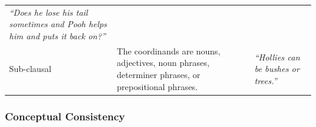 \documentclass[oneside]{report}
\theoremstyle{definition}
\theoremstyle{definition}
\theoremstyle{definition}
\theoremstyle{remark}
\begin{document}
\begin{longtable}[]{@{}lll@{}}
\begin{minipage}[t]{0.37\columnwidth}
\emph{``Does he lose his tail sometimes and Pooh helps him and puts it
back on?''}\strut
\end{minipage}\tabularnewline
\begin{minipage}[t]{0.17\columnwidth}\raggedright\strut
Sub-clausal\strut
\end{minipage} & \begin{minipage}[t]{0.37\columnwidth}\raggedright\strut
The coordinands are nouns, adjectives, noun phrases, determiner phrases,
or prepositional phrases.\strut
\end{minipage} & \begin{minipage}[t]{0.37\columnwidth}\raggedright\strut
\emph{``Hollies can be bushes or trees.''}\strut
\end{minipage}\tabularnewline
\bottomrule
\end{longtable}
\subsubsection{Conceptual Consistency}\label{conceptual-consistency}
\end{document}
